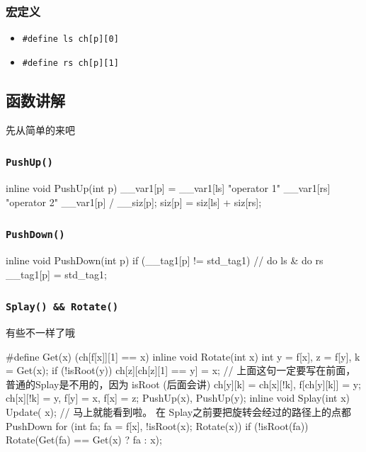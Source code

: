 \subsubsection{宏定义}

\begin{itemize}
\item \texttt{\#define ls ch[p][0]}
\item \texttt{\#define rs ch[p][1]}
\end{itemize}

\subsection{函数讲解}

先从简单的来吧

\subsubsection{\texttt{PushUp()}}

\begin{cppcode}
inline void PushUp(int p) {
  __var1[p] =
      __var1[ls] "operator 1" __var1[rs] "operator 2" __var1[p] / __siz[p];
  siz[p] = siz[ls] + siz[rs];
}
\end{cppcode}

\subsubsection{\texttt{PushDown()}}

\begin{cppcode}
inline void PushDown(int p) {
  if (__tag1[p] != std_tag1) {
    // do ls & do rs
    __tag1[p] = std_tag1;
  }
}
\end{cppcode}

\subsubsection{\texttt{Splay() \&\& Rotate()}}

有些不一样了哦

\begin{cppcode}
#define Get(x) (ch[f[x]][1] == x)
inline void Rotate(int x) {
  int y = f[x], z = f[y], k = Get(x);
  if (!isRoot(y)) ch[z][ch[z][1] == y] = x;
  // 上面这句一定要写在前面，普通的Splay是不用的，因为 isRoot  (后面会讲)
  ch[y][k] = ch[x][!k], f[ch[y][k]] = y;
  ch[x][!k] = y, f[y] = x, f[x] = z;
  PushUp(x), PushUp(y);
}
inline void Splay(int x) {
  Update(
      x);  // 马上就能看到啦。 在 Splay之前要把旋转会经过的路径上的点都PushDown
  for (int fa; fa = f[x], !isRoot(x); Rotate(x)) {
    if (!isRoot(fa)) Rotate(Get(fa) == Get(x) ? fa : x);
  }
}
\end{cppcode}

